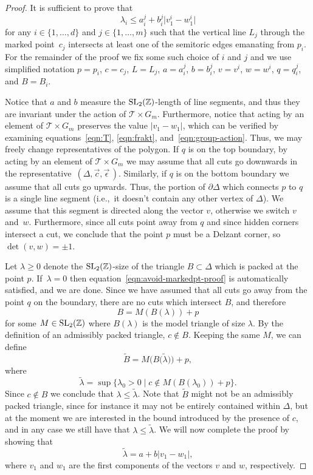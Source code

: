 \documentclass[pdftex]{sigma}
\numberwithin{equation}{section}
\def\Z{{\mathbb Z}}
\newcommand{\De}{\Delta}
\newcommand{\SL}{{\rm SL}_2(\Z)}
\newcommand{\strep}{(\De,\vec{c},\vec{\epsilon}\,)}
\begin{document}
\begin{proof}
It is sufficient to prove that
\begin{equation}\label{eqn:avoid-markedpt-proof}
 \lambda_i\leq a_i^j + b_i^j \big|v_1^i - w_1^i\big|
\end{equation}
for any $i\in\{1,\ldots, d\}$ and $j\in\{1,\ldots, m\}$ such that the vertical line $L_j$ through the marked point~$c_j$ intersects at least one of the semitoric edges emanating from $p_i$.
For the remainder of the proof we fix some such choice of $i$ and $j$ and we use simplified notation $p=p_i$, $c=c_j$, $L=L_j$, $a = a_i^j$, $b = b_i^j$, $v = v^i$, $w=w^i$, $q=q_i^j$, and $B=B_i$.

Notice that $a$ and $b$ measure the $\SL$-length of line segments, and thus they are invariant under the action of $\mathcal{T}\times G_m$.
Furthermore, notice that acting by an element of $\mathcal{T}\times G_m$ preserves the value $|v_1-w_1|$, which can be verified by examining equations~\eqref{eqn:T}, \eqref{eqn:frakt}, and~\eqref{eqn:group-action}.
Thus, we may freely change representatives of the polygon.
If $q$ is on the top boundary, by acting by an element of $\mathcal{T}\times G_m$ we may assume that all cuts go downwards in the representative~$\strep$.
Similarly, if $q$ is on the bottom boundary we assume that all cuts go upwards.
Thus, the portion of $\partial \De$ which connects $p$ to $q$ is a single line segment (i.e.,~it doesn't contain any other vertex of $\De$).
We assume that this segment is directed along the vector $v$, otherwise we switch $v$ and~$w$.
Furthermore, since all cuts point away from $q$ and since hidden corners intersect a cut, we conclude that the point $p$ must be a Delzant corner, so $\det(v,w) = \pm 1$.

Let $\lambda \geq 0$ denote the $\SL$-size of the triangle $B\subset \De$ which is packed at the point $p$.
If~$\lambda=0$ then equation~\eqref{eqn:avoid-markedpt-proof} is automatically satisfied, and we are done.
Since we have assumed that all cuts go away from the point $q$ on the boundary, there are no cuts which intersect $B$, and therefore
\[
 B = M(B(\lambda))+p
\]
for some $M\in\SL$ where $B(\lambda)$ is the model triangle of size $\lambda$.
By the definition of an admissibly packed triangle, $c\notin B$. Keeping the same $M$, we can define
\[
 \widetilde{B} = M\big(B\big(\widetilde{\lambda}\big)\big)+p,
\]
where
\[
 \widetilde{\lambda} = \sup\{\lambda_0>0 \mid c\notin M(B(\lambda_0))+p\}.
\]
Since $c\notin B$ we conclude that $\lambda\leq \widetilde{\lambda}$.
Note that $\widetilde{B}$ might not be an admissibly packed triangle, since for instance it may not be entirely contained within $\De$, but at the moment we are interested in the bound introduced by the presence of $c$, and in any case we still have that $\lambda\leq \widetilde{\lambda}$.
We will now complete the proof by showing that
\[
 \widetilde{\lambda} = a + b |v_1-w_1|,
\]
where $v_1$ and $w_1$ are the first components of the vectors $v$ and $w$, respectively.


\end{proof}
\end{document}

